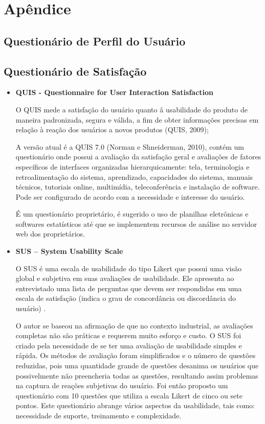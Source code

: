 \newpage
\appendix
\chapter{Apêndice}
\section{Questionário de Perfil do Usuário}


\section{Questionário de Satisfação}

\begin{itemize}

\item \textbf{QUIS - Questionnaire for User Interaction Satisfaction}

	O QUIS mede a satisfação do usuário quanto â usabilidade do produto de maneira padronizada, segura e válida, a fim de obter informações precisas em relação à reação dos usuários a novos produtos (QUIS, 2009);

	A versão atual é a QUIS 7.0 (Norman e Shneiderman, 2010), contém um questionário onde possui a avaliação da satisfação geral e avaliações de fatores específicos de interfaces organizadas hierarquicamente: tela, terminologia e retroalimentação do sistema, aprendizado, capacidades do sistema, manuais técnicos, tutoriais online, multimídia, teleconferência e instalação de software. Pode ser configurado de acordo com a necessidade e interesse do usuário. 

	É um questionário proprietário, é sugerido o uso de planilhas eletrônicas e softwares estatísticos até que se implementem recursos de análise no servidor web dos proprietários.

\item \textbf{SUS – System Usability Scale}

	O SUS é uma escala de usabilidade do tipo Likert que possui uma visão global e subjetiva em suas avaliações de usabilidade. Ele apresenta ao entrevistado uma lista de perguntas que devem ser respondidas em uma escala de satisfação (indica o grau de concordância ou discordância do usuário) \cite{brooke1996sus}.

	O autor se baseou na afirmação de que no contexto industrial, as avaliações completas não são práticas e requerem muito esforço e custo. O SUS foi criado pela necessidade de se ter uma avaliação de usabilidade simples e rápida. Os métodos de avaliação foram simplificados e o número de questões reduzidas, pois uma quantidade grande de questões desanima os usuários que possivelmente não preencheria todas as questões, resultando assim problemas na captura de reações subjetivas do usuário. Foi então proposto um questionário com 10 questões que utiliza a escala Likert de cinco ou sete pontos. Este questionário abrange vários aspectos da usabilidade, tais como: necessidade de suporte, treinamento e complexidade. %


\end{itemize}
